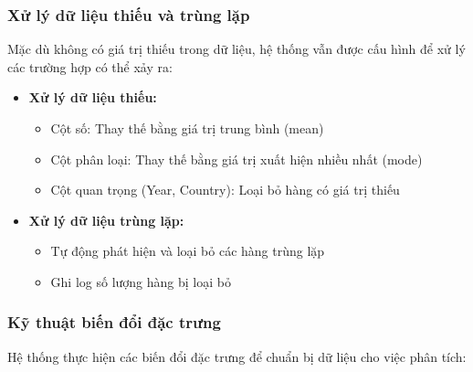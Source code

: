 \subsubsection{Xử lý dữ liệu thiếu và trùng lặp}

\hspace{0.5cm}Mặc dù không có giá trị thiếu trong dữ liệu, hệ thống vẫn được cấu hình để xử lý các trường hợp có thể xảy ra:

\begin{itemize}
    \item \textbf{Xử lý dữ liệu thiếu:}
    \begin{itemize}
        \item Cột số: Thay thế bằng giá trị trung bình (mean)
        \item Cột phân loại: Thay thế bằng giá trị xuất hiện nhiều nhất (mode)
        \item Cột quan trọng (Year, Country): Loại bỏ hàng có giá trị thiếu
    \end{itemize}
    
    \item \textbf{Xử lý dữ liệu trùng lặp:}
    \begin{itemize}
        \item Tự động phát hiện và loại bỏ các hàng trùng lặp
        \item Ghi log số lượng hàng bị loại bỏ
    \end{itemize}
\end{itemize}

\subsubsection{Kỹ thuật biến đổi đặc trưng}

\hspace{0.5cm}Hệ thống thực hiện các biến đổi đặc trưng để chuẩn bị dữ liệu cho việc phân tích:

